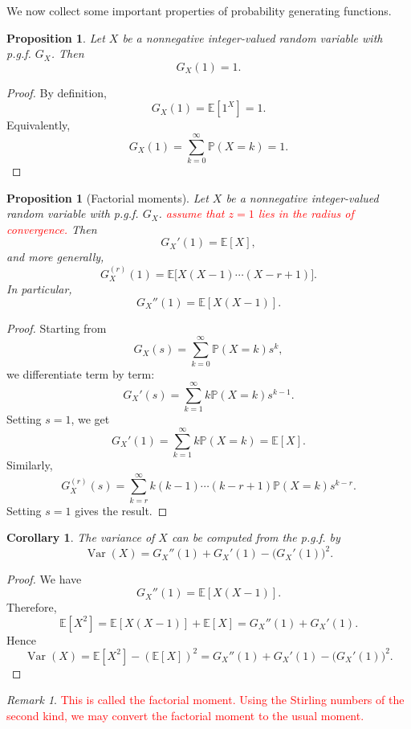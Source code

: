 \documentclass[11pt]{article}
\theoremstyle{plain}
\newtheorem{proposition}[theorem]{Proposition}
\newtheorem{corollary}[theorem]{Corollary}
\theoremstyle{definition}
\theoremstyle{remark}
\newtheorem{remark}[theorem]{Remark}
\begin{document}

	
	We now collect some important properties of probability generating functions.
	
	\begin{proposition}
		Let \(X\) be a nonnegative integer-valued random variable with p.g.f. \(G_X\). Then
		\[
		G_X(1)=1.
		\]
	\end{proposition}
	
	\begin{proof}
		By definition,
		\[
		G_X(1)
		=
		\mathbb{E}[1^X]
		=
		1.
		\]
		Equivalently,
		\[
		G_X(1)
		=
		\sum_{k=0}^{\infty}\mathbb{P}(X=k)
		=
		1.
		\]
	\end{proof}
	
	\begin{proposition}[Factorial moments]
		Let \(X\) be a nonnegative integer-valued random variable with p.g.f. \(G_X\). \textcolor{red}{assume that $z=1$ lies in the radius of convergence.} Then
		\[
		G_X'(1)=\mathbb{E}[X],
		\]
		and more generally,
		\[
		G_X^{(r)}(1)
		=
		\mathbb{E}\bigl[X(X-1)\cdots(X-r+1)\bigr].
		\]
		In particular,
		\[
		G_X''(1)
		=
		\mathbb{E}[X(X-1)].
		\]
	\end{proposition}
	
	\begin{proof}
		Starting from
		\[
		G_X(s)=\sum_{k=0}^{\infty}\mathbb{P}(X=k)s^k,
		\]
		we differentiate term by term:
		\[
		G_X'(s)
		=
		\sum_{k=1}^{\infty}k\mathbb{P}(X=k)s^{k-1}.
		\]
		Setting \(s=1\), we get
		\[
		G_X'(1)
		=
		\sum_{k=1}^{\infty}k\mathbb{P}(X=k)
		=
		\mathbb{E}[X].
		\]
		Similarly,
		\[
		G_X^{(r)}(s)
		=
		\sum_{k=r}^{\infty}
		k(k-1)\cdots(k-r+1)\mathbb{P}(X=k)s^{k-r}.
		\]
		Setting \(s=1\) gives the result.
	\end{proof}
	
	\begin{corollary}
		The variance of \(X\) can be computed from the p.g.f. by
		\[
		\operatorname{Var}(X)
		=
		G_X''(1)+G_X'(1)-\bigl(G_X'(1)\bigr)^2.
		\]
	\end{corollary}
	
	\begin{proof}
		We have
		\[
		G_X''(1)=\mathbb{E}[X(X-1)].
		\]
		Therefore,
		\[
		\mathbb{E}[X^2]
		=
		\mathbb{E}[X(X-1)]+\mathbb{E}[X]
		=
		G_X''(1)+G_X'(1).
		\]
		Hence
		\[
		\operatorname{Var}(X)
		=
		\mathbb{E}[X^2]-(\mathbb{E}[X])^2
		=
		G_X''(1)+G_X'(1)-\bigl(G_X'(1)\bigr)^2.
		\]
	\end{proof}
	\begin{remark}
	    \textcolor{red}{This is called the factorial moment. Using the Stirling numbers of the second kind, we may convert the factorial moment to the usual moment.}
	\end{remark}
	
\end{document}
